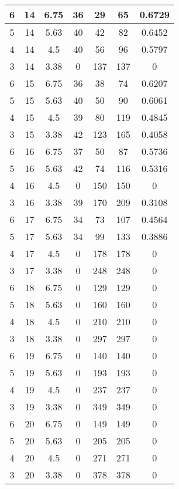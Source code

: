 \documentclass[letterpaper, 12pt]{article}
\begin{document}
\begin{longtable}{|c|c|c|c|c|c|c|}
6 & 14 & 6.75 & 36 & 29 & 65 & 0.6729 \\
\hline
5 & 14 & 5.63 & 40 & 42 & 82 & 0.6452 \\
\hline
4 & 14 & 4.5 & 40 & 56 & 96 & 0.5797 \\
\hline
3 & 14 & 3.38 & 0 & 137 & 137 & 0 \\
\hline
6 & 15 & 6.75 & 36 & 38 & 74 & 0.6207 \\
\hline
5 & 15 & 5.63 & 40 & 50 & 90 & 0.6061 \\
\hline
4 & 15 & 4.5 & 39 & 80 & 119 & 0.4845 \\
\hline
3 & 15 & 3.38 & 42 & 123 & 165 & 0.4058 \\
\hline
6 & 16 & 6.75 & 37 & 50 & 87 & 0.5736 \\
\hline
5 & 16 & 5.63 & 42 & 74 & 116 & 0.5316 \\
\hline
4 & 16 & 4.5 & 0 & 150 & 150 & 0 \\
\hline
3 & 16 & 3.38 & 39 & 170 & 209 & 0.3108 \\
\hline
6 & 17 & 6.75 & 34 & 73 & 107 & 0.4564 \\
\hline
5 & 17 & 5.63 & 34 & 99 & 133 & 0.3886 \\
\hline
4 & 17 & 4.5 & 0 & 178 & 178 & 0 \\
\hline
3 & 17 & 3.38 & 0 & 248 & 248 & 0 \\
\hline
6 & 18 & 6.75 & 0 & 129 & 129 & 0 \\
\hline
5 & 18 & 5.63 & 0 & 160 & 160 & 0 \\
\hline
4 & 18 & 4.5 & 0 & 210 & 210 & 0 \\
\hline
3 & 18 & 3.38 & 0 & 297 & 297 & 0 \\
\hline
6 & 19 & 6.75 & 0 & 140 & 140 & 0 \\
\hline
5 & 19 & 5.63 & 0 & 193 & 193 & 0 \\
\hline
4 & 19 & 4.5 & 0 & 237 & 237 & 0 \\
\hline
3 & 19 & 3.38 & 0 & 349 & 349 & 0 \\
\hline
6 & 20 & 6.75 & 0 & 149 & 149 & 0 \\
\hline
5 & 20 & 5.63 & 0 & 205 & 205 & 0 \\
\hline
4 & 20 & 4.5 & 0 & 271 & 271 & 0 \\
\hline
3 & 20 & 3.38 & 0 & 378 & 378 & 0 \\
\hline
\end{longtable}
\end{document}
